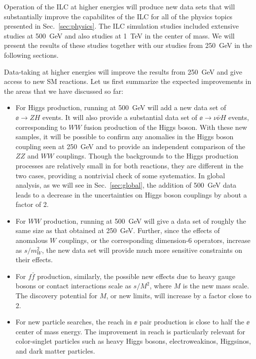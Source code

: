 Operation of the ILC at higher energies will produce new data sets
that will substantially improve the capabilites of the ILC for all of
the physics topics presented in Sec.~\ref{sec:physics}.    The ILC
simulation studies included extensive studies at 500~GeV 
 and also studies at 1~TeV in the center of mass.   We will present
 the results of these studies together with our studies from 250~GeV in
 the following sections.

Data-taking at higher energies will improve the results from 250~GeV
and give access to new SM reactions.   Let us first summarize the
expected
improvements in the areas that we have discussed so far:
\begin{itemize}
\item  For Higgs production, running   at 500~GeV will add a new data set
 of  $\ee\to ZH$ events.  It will also provide   a substantial data set of $\ee\to
 \nu\bar\nu H$ events, corresponding to $WW$ fusion production of the
 Higgs boson.   With these new samples, it will be possible to confirm
 any anomalies in the Higgs boson coupling seen at 250~GeV and to
 provide an independent comparison of the $ZZ$ and $WW$ couplings.
Though the backgrounds to the Higgs production processes are
relatively small in for both reactions, they are different in the two
cases, providing a nontrivial check of some systematics. In global
analysis, as we will see in Sec.~\ref{sec:global}, the addition of
500~GeV data leads to a decrease in the uncertainties on Higgs boson
couplings by about a factor of 2. 

\item For $WW$ production, running at 500~GeV will give a data set of
  roughly the same size as that obtained at 250~GeV.  Further, since
  the effects of anomalous $W$ couplings, or the corresponding
  dimension-6 operators, increase as $s/m_W^2$, the new data set will
  provide much more sensitive constraints on their effects.

\item For $f\bar f$ production, similarly, the possible new effects   
  due to heavy gauge bosons or contact interactions scale as $s/M^2$,
  where $M$ is the new mass scale.   The discovery potential for $M$,
  or new limits, will increase by a factor close to 2. 

\item For new particle searches, the reach in $\ee$ pair production is
  close to half the $\ee$  center of mass energy. The  improvement in
  reach is particularly relevant for color-singlet particles such as
  heavy Higgs bosons, electroweakinos, Higgsinos, and dark matter
  particles.  
\end{itemize}


